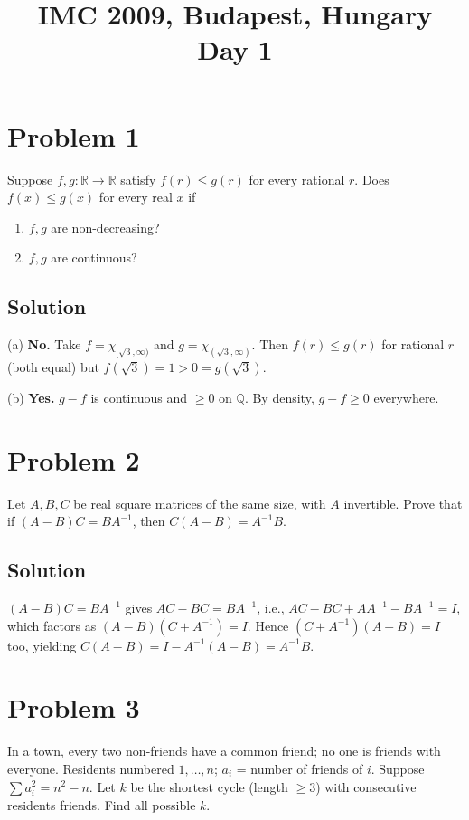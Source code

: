 \documentclass{article}
\title{IMC 2009, Budapest, Hungary \\ Day 1}
\date{}
\begin{document}
\maketitle

\section*{Problem 1}
Suppose $f, g : \mathbb{R} \to \mathbb{R}$ satisfy $f(r) \le g(r)$ for every rational $r$. Does $f(x) \le g(x)$ for every real $x$ if
\begin{enumerate}
  \item[a)] $f, g$ are non-decreasing?
  \item[b)] $f, g$ are continuous?
\end{enumerate}

\subsection*{Solution}
(a) \textbf{No.} Take $f = \chi_{[\sqrt 3, \infty)}$ and $g = \chi_{(\sqrt 3, \infty)}$. Then $f(r) \le g(r)$ for rational $r$ (both equal) but $f(\sqrt 3) = 1 > 0 = g(\sqrt 3)$.

(b) \textbf{Yes.} $g - f$ is continuous and $\ge 0$ on $\mathbb{Q}$. By density, $g - f \ge 0$ everywhere.

\section*{Problem 2}
Let $A, B, C$ be real square matrices of the same size, with $A$ invertible. Prove that if $(A - B)C = BA^{-1}$, then $C(A - B) = A^{-1} B$.

\subsection*{Solution}
$(A - B) C = BA^{-1}$ gives $AC - BC = BA^{-1}$, i.e., $AC - BC + AA^{-1} - BA^{-1} = I$, which factors as $(A - B)(C + A^{-1}) = I$. Hence $(C + A^{-1})(A - B) = I$ too, yielding $C(A - B) = I - A^{-1}(A - B) = A^{-1} B$.

\section*{Problem 3}
In a town, every two non-friends have a common friend; no one is friends with everyone. Residents numbered $1, \ldots, n$; $a_i$ = number of friends of $i$. Suppose $\sum a_i^2 = n^2 - n$. Let $k$ be the shortest cycle (length $\ge 3$) with consecutive residents friends. Find all possible $k$.
\end{document}
